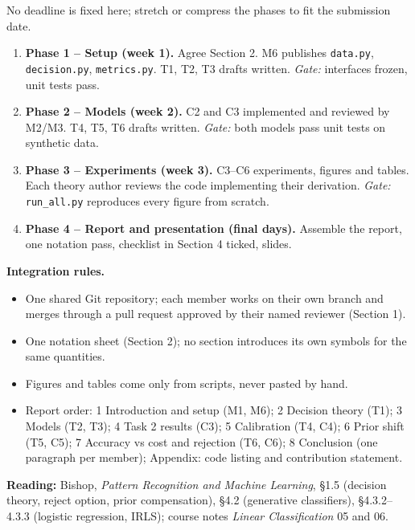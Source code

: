 \documentclass[11pt,a4paper]{article}
\begin{document}
No deadline is fixed here; stretch or compress the phases to fit the submission date.
\begin{enumerate}[itemsep=2pt]
  \item \textbf{Phase 1 -- Setup (week 1).} Agree Section 2. M6 publishes \texttt{data.py}, \texttt{decision.py}, \texttt{metrics.py}.
        T1, T2, T3 drafts written. \emph{Gate:} interfaces frozen, unit tests pass.
  \item \textbf{Phase 2 -- Models (week 2).} C2 and C3 implemented and reviewed by M2/M3. T4, T5, T6 drafts written.
        \emph{Gate:} both models pass unit tests on synthetic data.
  \item \textbf{Phase 3 -- Experiments (week 3).} C3--C6 experiments, figures and tables. Each theory author reviews the code implementing their derivation.
        \emph{Gate:} \texttt{run\_all.py} reproduces every figure from scratch.
  \item \textbf{Phase 4 -- Report and presentation (final days).} Assemble the report, one notation pass, checklist in Section 4 ticked, slides.
\end{enumerate}

\textbf{Integration rules.}
\begin{itemize}[itemsep=1pt,topsep=2pt]
  \item One shared Git repository; each member works on their own branch and merges through a pull request approved by their named reviewer (Section 1).
  \item One notation sheet (Section 2); no section introduces its own symbols for the same quantities.
  \item Figures and tables come only from scripts, never pasted by hand.
  \item Report order: 1 Introduction and setup (M1, M6); 2 Decision theory (T1); 3 Models (T2, T3); 4 Task 2 results (C3);
        5 Calibration (T4, C4); 6 Prior shift (T5, C5); 7 Accuracy vs cost and rejection (T6, C6);
        8 Conclusion (one paragraph per member); Appendix: code listing and contribution statement.
\end{itemize}

\textbf{Reading:} Bishop, \emph{Pattern Recognition and Machine Learning}, \S1.5 (decision theory, reject option, prior compensation),
\S4.2 (generative classifiers), \S4.3.2--4.3.3 (logistic regression, IRLS); course notes \emph{Linear Classification} 05 and 06.
\end{document}

